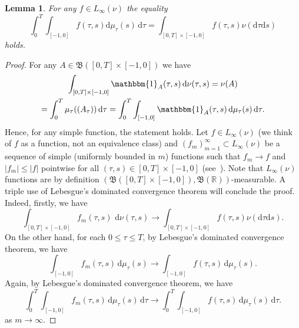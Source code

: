 \documentclass[reqno]{amsart}
\theoremstyle{plain}
\newtheorem{lemma}{Lemma}[section]
\numberwithin{equation}{section}
\numberwithin{definition}{section}
\newcommand\RR{\ensuremath{\mathbb{R}}}
\newcommand{\dd}{\ensuremath{\mathrm{d}}}
\begin{document}
\begin{lemma}\label{lemma:L-inf-equality} For any $f\in L_{\infty}(\nu)$ the equality 
    \begin{equation*}
  \int_0^T \int_{[-1,0]} f(\tau,s)  \dd \mu_{\tau} (s) \,\dd\tau = \int_{[0,T]\times [-1,0]} f(\tau,s)\nu(\dd \tau \dd s) 
\end{equation*}
holds.  
\end{lemma}
\begin{proof} For any $A\in \mathfrak{B}([0, T]\times [-1,0])$ we have 
\begin{multline*}
      \int_{[0,T]\times [-1,0]} \mathbbm{1}_{A}(\tau,s) \,\dd \nu(\tau,s)  = \nu(A) 
    \\ = \int_0^{T} \mu_{\tau}((A_{\tau}))\,\dd \tau
    =\int_0^{T}\int_{[-1,0]} \mathbbm{1}_{A}(\tau,s)\, \dd \mu_{\tau} (s) \,\dd \tau.
\end{multline*}
Hence, for any simple function, the statement holds. Let $f\in L_{\infty}(\nu)$ (we think of $f$ as a function, not an equivalence class) and $(f_m)_{m=1}^{\infty}\subset L_{\infty}(\nu)$ be a sequence of simple (uniformly bounded in $m$) functions such that $f_{m}\to f$ and $|f_m|\le |f|$ pointwise for all $(\tau,s)\in [0,T]\times [-1,0]$ (see~\cite[Thm. 2.10(b)]{Folland}). Note that $L_{\infty}(\nu)$ functions are by definition $(\mathfrak{B}([0, T]\times [-1,0]), \mathfrak{B}(\RR))$\nobreakdash-\hspace{0pt}measurable.
A triple use of Lebesgue's dominated convergence theorem will conclude the proof. Indeed, firstly, we have 
\begin{equation*}
     \int_{[0,T]\times [-1,0]} f_{m}(\tau,s)\, \,\dd \nu(\tau,s)\to \int_{[0,T]\times [-1,0]} f(\tau,s) \nu(\dd \tau \dd s ).  
\end{equation*}
On the other hand, for each $0 \le \tau \le T$, by Lebesgue's dominated convergence theorem, we have 
\begin{equation*}
  \int_{ [-1,0]} f_{m}(\tau,s)\, \dd \mu_{\tau} (s)  \to \int_{ [-1,0]} f(\tau,s)\, \dd \mu_{\tau} (s). 
\end{equation*}  
Again, by Lebesgue's dominated convergence theorem, we have
\begin{equation*} 
    \int_0^{T}\int_{ [-1,0]} f_m(\tau,s)\, \dd \mu_{\tau} (s) \,\dd \tau \to \int_0^{T}\int_{ [-1,0]} f(\tau,s)\, \dd \mu_{\tau} (s) \,\dd \tau. 
\end{equation*}
as $m\to\infty$. 
\end{proof} 
\end{document}
